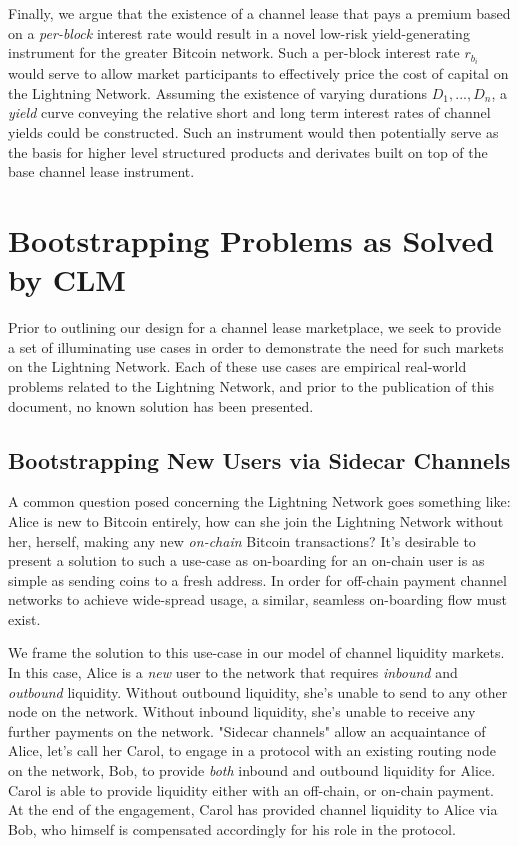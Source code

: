 \documentclass[10pt,a4paper]{article}
\theoremstyle{definition}
\begin{document}
Finally, we argue that the existence of a channel lease that pays a premium
based on a \emph{per-block} interest rate would result in a novel low-risk
yield-generating instrument for the greater Bitcoin network. Such a per-block
interest rate $r_{b_i}$ would serve to allow market participants to effectively
price the cost of capital on the Lightning Network. Assuming the existence of
varying durations ${D_1, ..., D_n}$, a \emph{yield} curve conveying the relative
short and long term interest rates of channel yields could be constructed. Such
an instrument would then potentially serve as the basis for higher level
structured products and derivates built on top of the base channel lease
instrument.


\section{Bootstrapping Problems as Solved by CLM}

Prior to outlining our design for a channel lease marketplace, we seek to provide
a set of illuminating use cases in order to demonstrate the need for such
markets on the Lightning Network. Each of these use cases are empirical
real-world problems related to the Lightning Network, and prior to the
publication of this document, no known solution has been presented.

\subsection{Bootstrapping New Users via Sidecar Channels}

A common question posed concerning the Lightning Network goes something like:
Alice is new to Bitcoin entirely, how can she join the Lightning Network
without her, herself, making any new \emph{on-chain} Bitcoin transactions? It's
desirable to present a solution to such a use-case as on-boarding for an on-chain
user is as simple as sending coins to a fresh address. In order for
off-chain payment channel networks to achieve wide-spread usage, a similar,
seamless on-boarding flow must exist.

We frame the solution to this use-case in our model of channel liquidity
markets. In this case, Alice is a \emph{new} user to the network that requires
\emph{inbound} and \emph{outbound} liquidity. Without outbound liquidity, she's
unable to send to any other node on the network. Without inbound liquidity,
she's unable to receive any further payments on the network. "Sidecar channels"
allow an acquaintance of Alice, let's call her
Carol, to engage in a protocol with an existing routing node on the network,
Bob, to provide \emph{both} inbound and outbound liquidity for Alice. Carol is
able to provide liquidity either with an off-chain, or on-chain payment. At the
end of the engagement, Carol has provided channel liquidity to Alice via Bob,
who himself is compensated accordingly for his role in the protocol.
\end{document}
